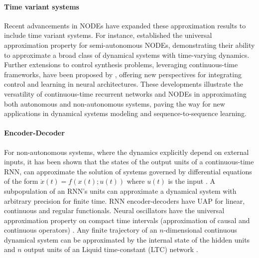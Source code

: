 \documentclass{article}
\theoremstyle{definition} \newtheorem{definition}{Definition}
\theoremstyle{remark} \newtheorem{remark}{Remark}
\newcounter{ct}
\begin{document}
\citep{lou2020neural}
	
\paragraph{Time variant systems}
Recent advancements in NODEs have expanded these approximation results to include time variant systems. For instance, \citet{li2024universal} established the universal approximation property for semi-autonomous NODEs, demonstrating their ability to approximate a broad class of dynamical systems with time-varying dynamics. Further extensions to control synthesis problems, leveraging continuous-time frameworks, have been proposed by \citet{mei2024controlsynth}, offering new perspectives for integrating control and learning in neural architectures.
%
These developments illustrate the versatility of continuous-time recurrent networks and NODEs in approximating both autonomous and non-autonomous systems, paving the way for new applications in dynamical systems modeling and sequence-to-sequence learning.


\paragraph{Encoder-Decoder}
For non-autonomous systems, where the dynamics explicitly depend on external inputs, it has been shown that the states of the output units of a continuous-time RNN, can approximate the solution of systems governed by differential equations of the form $\dot{x}(t) = f(x(t); u(t))$ where $u(t)$ is the input \citep{garces2012strategies}. %
A subpopulation of an RNN's units can approximate a dynamical system with arbitrary precision for finite time\citep{kambhampati2000approximation}. %
RNN encoder-decoders have UAP for linear, continuous and regular functionals\citep{li2021approximationencdec}.
Neural oscillators have the universal approximation property on compact time intervals (approximation of causal and continuous operators) \citep{lanthaler2023neuraloscillators}.
%
Any finite trajectory of an $n$-dimensional continuous dynamical system can be approximated by the internal state of the hidden units and $n$ output units of an Liquid time-constant (LTC) network \citep{hasani2018liquid}.
\end{document}
